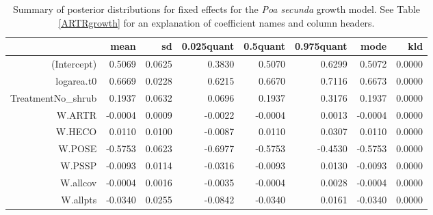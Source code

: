 \documentclass[11pt]{article}
\begin{document}
\begin{table}[ht]
\centering
\caption{Summary of posterior distributions for fixed effects for the \textit{Poa secunda} growth model. See Table \ref{ARTRgrowth} for an explanation of coefficient names
and column headers.} 
\label{POSEgrowth}
\begin{tabular}{rrrrrrrr}
  \hline
 & mean & sd & 0.025quant & 0.5quant & 0.975quant & mode & kld \\ 
  \hline
(Intercept) & 0.5069 & 0.0625 & 0.3830 & 0.5070 & 0.6299 & 0.5072 & 0.0000 \\ 
  logarea.t0 & 0.6669 & 0.0228 & 0.6215 & 0.6670 & 0.7116 & 0.6673 & 0.0000 \\ 
  TreatmentNo\_shrub & 0.1937 & 0.0632 & 0.0696 & 0.1937 & 0.3176 & 0.1937 & 0.0000 \\ 
  W.ARTR & -0.0004 & 0.0009 & -0.0022 & -0.0004 & 0.0013 & -0.0004 & 0.0000 \\ 
  W.HECO & 0.0110 & 0.0100 & -0.0087 & 0.0110 & 0.0307 & 0.0110 & 0.0000 \\ 
  W.POSE & -0.5753 & 0.0623 & -0.6977 & -0.5753 & -0.4530 & -0.5753 & 0.0000 \\ 
  W.PSSP & -0.0093 & 0.0114 & -0.0316 & -0.0093 & 0.0130 & -0.0093 & 0.0000 \\ 
  W.allcov & -0.0004 & 0.0016 & -0.0035 & -0.0004 & 0.0028 & -0.0004 & 0.0000 \\ 
  W.allpts & -0.0340 & 0.0255 & -0.0842 & -0.0340 & 0.0161 & -0.0340 & 0.0000 \\ 
   \hline
\end{tabular}
\end{table}
\end{document}
